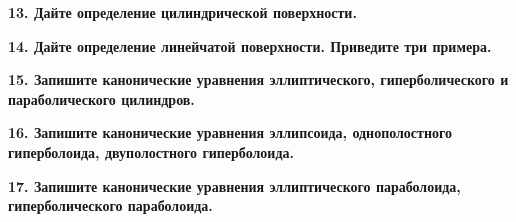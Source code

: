 \documentclass[11pt,a4paper]{article}
\begin{document}
\textbf{13. Дайте определение цилиндрической поверхности.\\}

\textbf{14. Дайте определение линейчатой поверхности. Приведите три примера.\\}

\textbf{15. Запишите канонические уравнения эллиптического, гиперболического и параболического цилиндров.\\}

\textbf{16. Запишите канонические уравнения эллипсоида, однополостного гиперболоида, двуполостного гиперболоида.\\}

\textbf{17. Запишите канонические уравнения эллиптического параболоида, гиперболического параболоида.\\}
\end{document}
